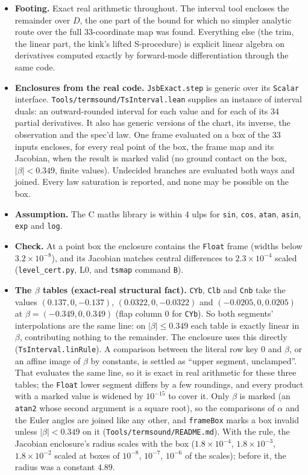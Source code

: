 \documentclass[11pt]{article}
\begin{document}
\begin{itemize}
\item \textbf{Footing.} Exact real arithmetic throughout. The interval tool encloses the remainder over $D$, the one part of the bound for which no simpler analytic route over the full 33-coordinate map was found. Everything else (the trim, the linear part, the kink's lifted S-procedure) is explicit linear algebra on derivatives computed exactly by forward-mode differentiation through the same code.
\item \textbf{Enclosures from the real code.} \texttt{JsbExact.step} is generic over its \texttt{Scalar} interface. \texttt{Tools/termsound/TsInterval.lean} supplies an instance of interval duals: an outward-rounded interval for each value and for each of its 34 partial derivatives. It also has generic versions of the chart, its inverse, the observation and the spec'd law. One frame evaluated on a box of the 33 inputs encloses, for every real point of the box, the frame map and its Jacobian, when the result is marked valid (no ground contact on the box, $|\beta| < 0.349$, finite values). Undecided branches are evaluated both ways and joined. Every law saturation is reported, and none may be possible on the box.
\item \textbf{Assumption.} The C maths library is within 4 ulps for \texttt{sin}, \texttt{cos}, \texttt{atan}, \texttt{asin}, \texttt{exp} and \texttt{log}.
\item \textbf{Check.} At a point box the enclosure contains the \texttt{Float} frame (widths below $3.2\times10^{-8}$), and its Jacobian matches central differences to $2.3\times10^{-4}$ scaled (\texttt{level\_cert.py}, L0, and \texttt{tsmap} command \texttt{B}).
\item \textbf{The $\beta$ tables (exact-real structural fact).} \texttt{CYb}, \texttt{Clb} and \texttt{Cnb} take the values $(0.137, 0, -0.137)$, $(0.0322, 0, -0.0322)$ and $(-0.0205, 0, 0.0205)$ at $\beta = (-0.349, 0, 0.349)$ (flap column 0 for \texttt{CYb}). So both segments' interpolations are the same line: on $|\beta| \le 0.349$ each table is exactly linear in $\beta$, contributing nothing to the remainder. The enclosure uses this directly (\texttt{TsInterval.linRule}). A comparison between the literal row key 0 and $\beta$, or an affine image of $\beta$ by constants, is settled as ``upper segment, unclamped''. That evaluates the same line, so it is exact in real arithmetic for these three tables; the \texttt{Float} lower segment differs by a few roundings, and every product with a marked value is widened by $10^{-15}$ to cover it. Only $\beta$ is marked (an \texttt{atan2} whose second argument is a square root), so the comparisons of $\alpha$ and the Euler angles are joined like any other, and \texttt{frameBox} marks a box invalid unless $|\beta| < 0.349$ on it (\texttt{Tools/termsound/README.md}). With the rule, the Jacobian enclosure's radius scales with the box ($1.8\times10^{-4}$, $1.8\times10^{-3}$, $1.8\times10^{-2}$ scaled at boxes of $10^{-8}$, $10^{-7}$, $10^{-6}$ of the scales); before it, the radius was a constant $4.89$.

\end{itemize}
\end{document}
